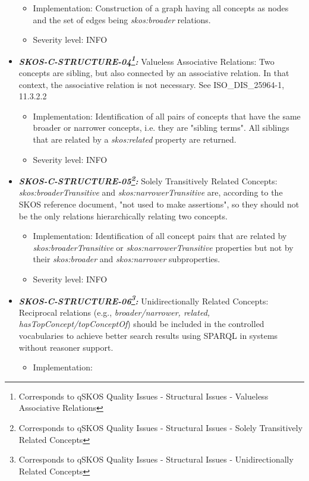 \documentclass{llncs}
\begin{document}
\begin{itemize}
	\begin{itemize}
		\item Implementation: Construction of a graph having all concepts as nodes and the set of edges being \emph{skos:broader} relations. 
		\item Severity level: INFO
\end{itemize}
	\item \textbf{{\em SKOS-C-STRUCTURE-04\footnote{Corresponds to qSKOS Quality Issues - Structural Issues - Valueless Associative Relations}:}}
	Valueless Associative Relations:
	Two concepts are sibling, but also connected by an associative relation. In that context, the associative relation is not necessary. See ISO\_DIS\_25964-1, 11.3.2.2 
	\begin{itemize}
		\item Implementation:
		Identification of all pairs of concepts that have the same broader or narrower concepts, i.e. they are "sibling terms". All siblings that are related by a \emph{skos:related} property are returned. 
	  \item Severity level: INFO
\end{itemize}
	\item \textbf{{\em SKOS-C-STRUCTURE-05\footnote{Corresponds to qSKOS Quality Issues - Structural Issues - Solely Transitively Related Concepts}:}}
	Solely Transitively Related Concepts:
	\emph{skos:broaderTransitive} and \emph{skos:narrowerTransitive} are, according to the SKOS reference document, "not used to make assertions", so they should not be the only relations hierarchically relating two concepts. 
	\begin{itemize}
		\item Implementation: Identification of all concept pairs that are related by \emph{skos:broaderTransitive} or \emph{skos:narrowerTransitive} properties but not by their \emph{skos:broader} and \emph{skos:narrower} subproperties. 
		\item Severity level: INFO
\end{itemize}
	\item \textbf{{\em SKOS-C-STRUCTURE-06\footnote{Corresponds to qSKOS Quality Issues - Structural Issues - Unidirectionally Related Concepts}:}}
	Unidirectionally Related Concepts:
	Reciprocal relations (e.g., \emph{broader/narrower, related, hasTopConcept/topConceptOf}) should be included in the controlled vocabularies to achieve better search results using SPARQL in systems without reasoner support. 
	\begin{itemize}
		\item Implementation:

\end{itemize}
\end{itemize}
\end{document}
